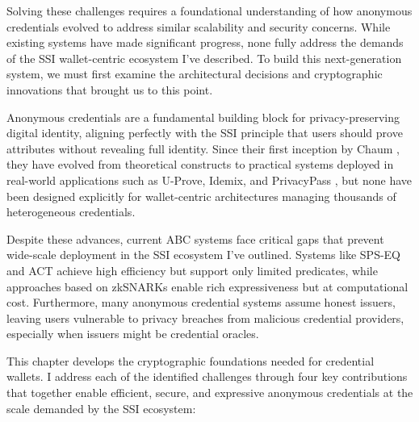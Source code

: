 Solving these challenges requires a foundational understanding of how anonymous credentials evolved to address similar scalability and security concerns. While existing systems have made significant progress, none fully address the demands of the SSI wallet-centric ecosystem I've described. To build this next-generation system, we must first examine the architectural decisions and cryptographic innovations that brought us to this point.

Anonymous credentials are a fundamental building block for privacy-preserving digital identity, aligning perfectly with the SSI principle that users should prove attributes without revealing full identity. Since their first inception by Chaum \cite{chaum_untraceable_1981}, they have evolved from theoretical constructs to practical systems deployed in real-world applications such as U-Prove, Idemix, and PrivacyPass \cite{camenisch_design_2002, dunkelman_formal_2016}, but none have been designed explicitly for wallet-centric architectures managing thousands of heterogeneous credentials. 

Despite these advances, current ABC systems face critical gaps that prevent wide-scale deployment in the SSI ecosystem I've outlined.  Systems like SPS-EQ \cite{fuchsbauer_structure-preserving_2019, hanaoka_improved_2022} and ACT \cite{guo_anonymous_2023} achieve high efficiency but support only limited predicates, while approaches based on zkSNARKs enable rich expressiveness \cite{rosenberg_zk-creds_2022} but at computational cost. Furthermore, many anonymous credential systems assume honest issuers, leaving users vulnerable to privacy breaches from malicious credential providers, especially when issuers might be credential oracles.

This chapter develops the cryptographic foundations needed for credential wallets. I address each of the identified challenges through four key contributions that together enable efficient, secure, and expressive anonymous credentials at the scale demanded by the SSI ecosystem:


